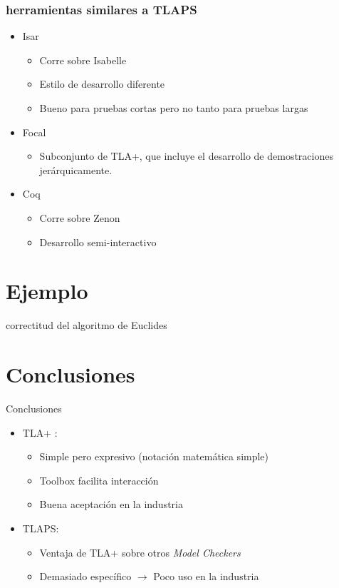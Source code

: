 \documentclass[12pt]{beamer}
\newenvironment{stepitemize}{\begin{itemize}[<+->]}{\end{itemize} }
\begin{document}
\begin{frame}

  \frametitle{herramientas similares a TLAPS}
  \begin{stepitemize}
	  \item Isar
	  \begin{itemize}
	    \item Corre sobre Isabelle
	    \item Estilo de desarrollo diferente
	    \item Bueno para pruebas cortas pero no tanto para pruebas largas
	   \end{itemize}
	   \item Focal
	    \begin{itemize}
	     \item Subconjunto de TLA+, que incluye el desarrollo de demostraciones jerárquicamente. 
	    \end{itemize}
	   \item Coq
	   \begin{itemize}
	    \item Corre sobre Zenon
	    \item Desarrollo semi-interactivo
	   \end{itemize}

	    

  \end{stepitemize}


\end{frame}

\section{Ejemplo}
\begin{frame}
correctitud del algoritmo de Euclides
\end{frame}

\section{Conclusiones}
\begin{frame}{Conclusiones}
  \begin{stepitemize}
  \item TLA+ : 
  	   \begin{itemize}
	    \item Simple pero expresivo (notación matemática simple)
	    \item Toolbox facilita interacción
	    \item Buena aceptación en la industria
	   \end{itemize}
  \item TLAPS: 
    	   \begin{itemize}
	    \item Ventaja de TLA+ sobre otros \textit{Model Checkers}
	    \item Demasiado específico $\rightarrow$ Poco uso en la industria
	   \end{itemize}
  \end{stepitemize}
\end{frame}
\end{document}
